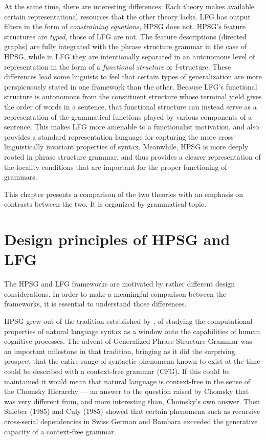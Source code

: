 At the same time, there are interesting differences.  Each theory makes available certain representational resources that the other theory lacks.   LFG has output filters in the form of \textit{constraining equations}, HPSG does not.  HPSG's feature structures are \textit{typed}, those of LFG are not.  The feature descriptions (directed graphs) are fully integrated with the phrase structure grammar in the case of HPSG, while in LFG they are intentionally separated in an autonomous level of representation in the form of a \textit{functional structure} or f-structure.  These differences lead some linguists to feel that certain types of generalization are more perspicuously stated in one framework than the other.   Because LFG's functional structure is autonomous from the constituent structure whose terminal yield gives the order of words in a sentence, that functional structure can instead serve as a representation of the grammatical functions played by various components of a sentence.  This makes LFG more amenable to a functionalist motivation, and also provides a standard representation language for capturing the more cross-linguistically invariant properties of syntax.  Meanwhile, HPSG is more deeply rooted in phrase structure grammar, and thus provides a clearer representation of the locality conditions that are important for the proper functioning of grammars.  

This chapter presents a comparison of the two theories with an emphasis on contrasts between the two.  It is organized by grammatical topic.  

\section{Design principles of HPSG and LFG} 
The HPSG and LFG  frameworks are motivated by rather different design considerations.  In order to make a meaningful comparison between the frameworks, it is essential to understand those differences.  

HPSG grew out of the tradition established by \citet{Chomsky57a}, of studying the computational properties of natural language syntax as a window onto the capabilities of human cognitive processes.  The advent of Generalized Phrase Structure Grammar  \citep{GKPS85a} was an important milestone in that tradition, bringing as it did the surprising prospect that the entire range of syntactic phenomena known to exist at the time could be described with a context-free grammar (CFG).  If this could be maintained it would mean that natural language is context-free in the sense of the Chomsky Hierarchy \citep{Chomsky57a}--- an answer to the question raised by Chomsky that was very different from, and more interesting than, Chomsky's own answer.  Then Shieber (1985) and Culy (1985) showed that certain phenomena such as recursive cross-serial dependencies in Swiss German and Bambara exceeded the generative capacity of a context-free grammar.   

